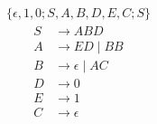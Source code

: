 \documentclass{article}
\begin{document}
\begin{align*}
	\{\epsilon, 1, 0; S, A, B, D, E, C; S\}
\end{align*}
\begin{align*}
S &\rightarrow ABD \\ 
A &\rightarrow ED\;|\;BB \\ 
B &\rightarrow \epsilon\;|\;AC \\ 
D &\rightarrow 0 \\ 
E &\rightarrow 1 \\ 
C &\rightarrow \epsilon \\ 
\end{align*}
\end{document}
